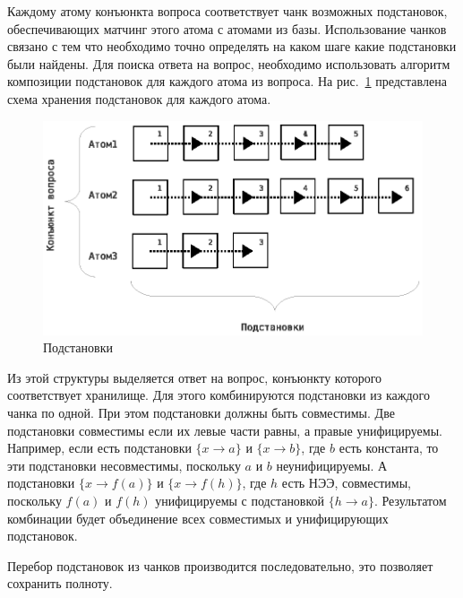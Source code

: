 Каждому атому конъюнкта вопроса соответствует чанк возможных подстановок, обеспечивающих матчинг этого атома с атомами из базы. Использование чанков связано с тем что необходимо точно определять на каком шаге какие подстановки были найдены. Для поиска ответа на вопрос, необходимо использовать алгоритм композиции подстановок для каждого атома из вопроса. На рис.~\ref{fig:anbase} представлена схема хранения подстановок для каждого атома.
\begin{figure}[h]
	\centering
	\includegraphics[width=0.6\linewidth]{pics/AnBase.eps}
	\caption{Подстановки}
	\label{fig:anbase}
\end{figure}

Из этой структуры выделяется ответ на вопрос, конъюнкту которого соответствует хранилище. Для этого комбинируются подстановки из каждого чанка по одной. При этом подстановки должны быть совместимы. Две подстановки совместимы если их левые части равны, а правые унифицируемы. Например, если есть подстановки $\{x \rightarrow a\}$ и $\{x \rightarrow b\}$, где $b$ есть константа, то эти подстановки несовместимы, поскольку $a$ и $b$ неунифицируемы. А подстановки $\{x \rightarrow f(a)\}$ и $\{x \rightarrow f(h)\}$, где $h$ есть НЭЭ, совместимы, поскольку $f(a)$ и $f(h)$ унифицируемы с подстановкой $\{h \rightarrow a\}$. Результатом комбинации будет объединение всех совместимых и унифицирующих подстановок.

Перебор подстановок из чанков производится последовательно, это позволяет сохранить полноту.



